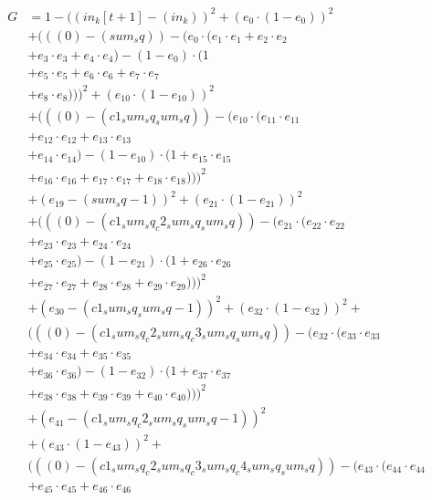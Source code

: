 \documentclass[10pt, a4paper]{article}
\begin{document}
\begin{small}
\begin{align*}
G &= 1 - ((in_k[t+1] - (in_k))^{2} + (e_{0} \cdot (1 - e_{0}))^{2} \\
& + (((0) - (sum_sq)) - (e_{0} \cdot (e_{1} \cdot e_{1} + e_{2} \cdot e_{2} \\
& + e_{3} \cdot e_{3} + e_{4} \cdot e_{4}) - (1 - e_{0}) \cdot (1 \\
& + e_{5} \cdot e_{5} + e_{6} \cdot e_{6} + e_{7} \cdot e_{7} \\
& + e_{8} \cdot e_{8})))^{2} + (e_{10} \cdot (1 - e_{10}))^{2} \\
& + (((0) - (c1_sum_sq_sum_sq)) - (e_{10} \cdot (e_{11} \cdot e_{11} \\
& + e_{12} \cdot e_{12} + e_{13} \cdot e_{13} \\
& + e_{14} \cdot e_{14}) - (1 - e_{10}) \cdot (1 + e_{15} \cdot e_{15} \\
& + e_{16} \cdot e_{16} + e_{17} \cdot e_{17} + e_{18} \cdot e_{18})))^{2} \\
& + (e_{19} - (sum_sq - 1))^{2} + (e_{21} \cdot (1 - e_{21}))^{2} \\
& + (((0) - (c1_sum_sq_c2_sum_sq_sum_sq)) - (e_{21} \cdot (e_{22} \cdot e_{22} \\
& + e_{23} \cdot e_{23} + e_{24} \cdot e_{24} \\
& + e_{25} \cdot e_{25}) - (1 - e_{21}) \cdot (1 + e_{26} \cdot e_{26} \\
& + e_{27} \cdot e_{27} + e_{28} \cdot e_{28} + e_{29} \cdot e_{29})))^{2} \\
& + (e_{30} - (c1_sum_sq_sum_sq - 1))^{2} + (e_{32} \cdot (1 - e_{32}))^{2} + \\
& (((0) - (c1_sum_sq_c2_sum_sq_c3_sum_sq_sum_sq)) - (e_{32} \cdot (e_{33} \cdot e_{33} \\
& + e_{34} \cdot e_{34} + e_{35} \cdot e_{35} \\
& + e_{36} \cdot e_{36}) - (1 - e_{32}) \cdot (1 + e_{37} \cdot e_{37} \\
& + e_{38} \cdot e_{38} + e_{39} \cdot e_{39} + e_{40} \cdot e_{40})))^{2} \\
& + (e_{41} - (c1_sum_sq_c2_sum_sq_sum_sq - 1))^{2} \\
& + (e_{43} \cdot (1 - e_{43}))^{2} + \\
& (((0) - (c1_sum_sq_c2_sum_sq_c3_sum_sq_c4_sum_sq_sum_sq)) - (e_{43} \cdot (e_{44} \cdot e_{44} \\
& + e_{45} \cdot e_{45} + e_{46} \cdot e_{46} \\

\end{align*}
\end{small}
\end{document}
